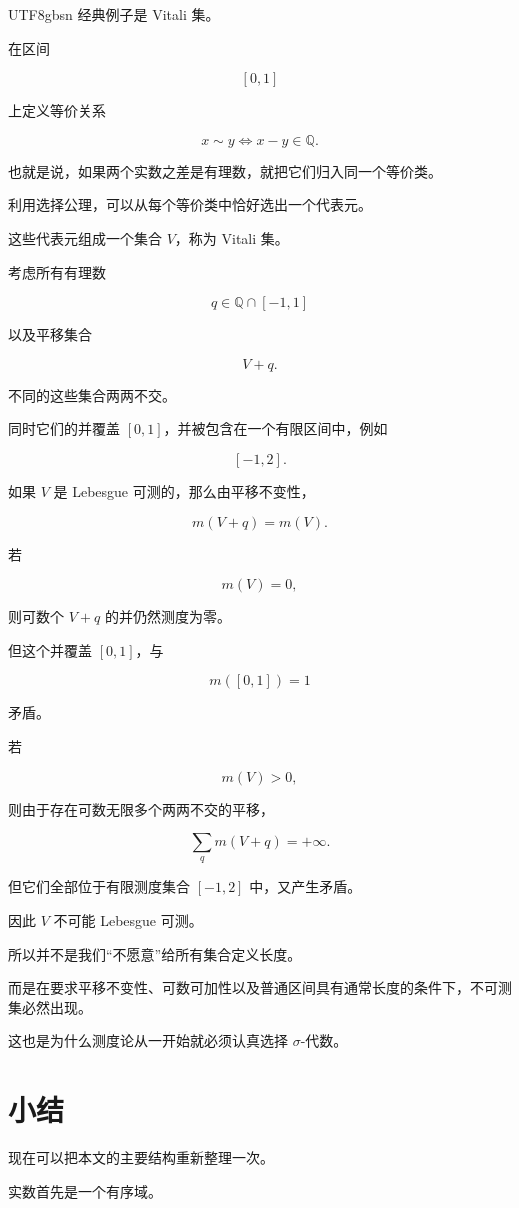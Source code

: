 \documentclass[11pt]{article}
\begin{document}
\begin{CJK*}{UTF8}{gbsn}
经典例子是 Vitali 集。

在区间

\[
[0,1]
\]

上定义等价关系

\[
x\sim y\Longleftrightarrow x-y\in\mathbb{Q}.
\]

也就是说，如果两个实数之差是有理数，就把它们归入同一个等价类。

利用选择公理，可以从每个等价类中恰好选出一个代表元。

这些代表元组成一个集合 $V$，称为 Vitali 集。

考虑所有有理数

\[
q\in\mathbb{Q}\cap[-1,1]
\]

以及平移集合

\[
V+q.
\]

不同的这些集合两两不交。

同时它们的并覆盖 $[0,1]$，并被包含在一个有限区间中，例如

\[
[-1,2].
\]

如果 $V$ 是 Lebesgue 可测的，那么由平移不变性，

\[
m(V+q)=m(V).
\]

若

\[
m(V)=0,
\]

则可数个 $V+q$ 的并仍然测度为零。

但这个并覆盖 $[0,1]$，与

\[
m([0,1])=1
\]

矛盾。

若

\[
m(V)>0,
\]

则由于存在可数无限多个两两不交的平移，

\[
\sum_{q}m(V+q)=+\infty.
\]

但它们全部位于有限测度集合 $[-1,2]$ 中，又产生矛盾。

因此 $V$ 不可能 Lebesgue 可测。

所以并不是我们“不愿意”给所有集合定义长度。

而是在要求平移不变性、可数可加性以及普通区间具有通常长度的条件下，不可测集必然出现。

这也是为什么测度论从一开始就必须认真选择 $\sigma$-代数。

\section*{小结}

现在可以把本文的主要结构重新整理一次。

实数首先是一个有序域。


\end{CJK*}
\end{document}
